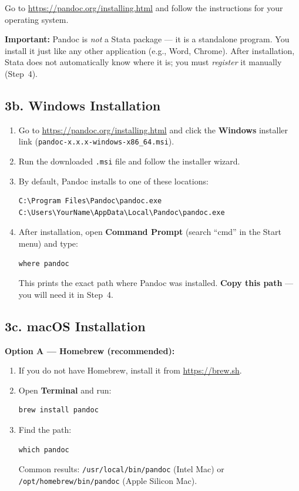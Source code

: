 \documentclass[paper=a4, fontsize=11pt]{scrartcl}
\begin{document}
Go to \url{https://pandoc.org/installing.html} and follow the instructions for your
operating system.

\medskip
\begin{warnbox}
\textbf{Important:} Pandoc is \textit{not} a Stata package --- it is a standalone
program. You install it just like any other application (e.g., Word, Chrome).
After installation, Stata does not automatically know where it is; you must
\textit{register} it manually (Step~4).
\end{warnbox}

\subsection*{3b. Windows Installation}

\begin{enumerate}
  \item Go to \url{https://pandoc.org/installing.html} and click the
        \textbf{Windows} installer link (\texttt{pandoc-x.x.x-windows-x86\_64.msi}).
  \item Run the downloaded \texttt{.msi} file and follow the installer wizard.
  \item By default, Pandoc installs to one of these locations:
\begin{lstlisting}[style=stata]
C:\Program Files\Pandoc\pandoc.exe
C:\Users\YourName\AppData\Local\Pandoc\pandoc.exe
\end{lstlisting}
  \item After installation, open \textbf{Command Prompt} (search ``cmd'' in the
        Start menu) and type:
\begin{lstlisting}[style=shell]
where pandoc
\end{lstlisting}
        This prints the exact path where Pandoc was installed.
        \textbf{Copy this path} --- you will need it in Step~4.
\end{enumerate}

\subsection*{3c. macOS Installation}

\textbf{Option A --- Homebrew (recommended):}
\begin{enumerate}
  \item If you do not have Homebrew, install it from \url{https://brew.sh}.
  \item Open \textbf{Terminal} and run:
\begin{lstlisting}[style=shell]
brew install pandoc
\end{lstlisting}
  \item Find the path:
\begin{lstlisting}[style=shell]
which pandoc
\end{lstlisting}
        Common results: \texttt{/usr/local/bin/pandoc} (Intel Mac) or
        \texttt{/opt/homebrew/bin/pandoc} (Apple Silicon Mac).
\end{enumerate}
\end{document}
